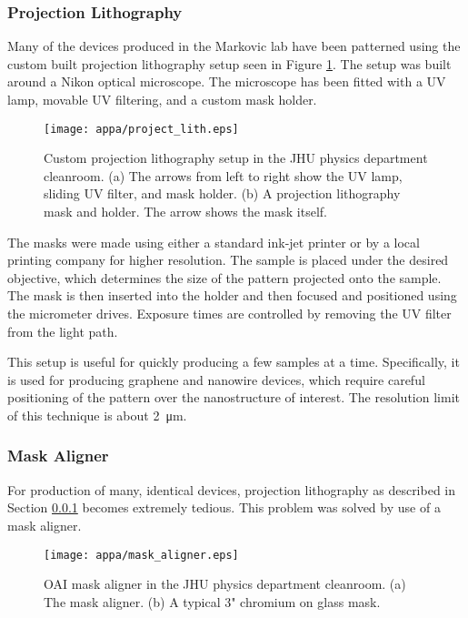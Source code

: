 \subsubsection{Projection Lithography}
\label{subsubsec:project_lith}

Many of the devices produced in the Markovic lab have been patterned using the custom built projection lithography setup seen in Figure \ref{fig:project_lith}. The setup was built around a Nikon optical microscope. The microscope has been fitted with a UV lamp, movable UV filtering, and a custom mask holder.

\begin{figure}
    \centering
    \texttt{[image: appa/project\_lith.eps]}
    \caption{Custom projection lithography setup in the JHU physics department cleanroom. (a) The arrows from left to right show the UV lamp, sliding UV filter, and mask holder. (b) A projection lithography mask and holder. The arrow shows the mask itself.}
    \label{fig:project_lith}
\end{figure}

The masks were made using either a standard ink-jet printer or by a local printing company for higher resolution. The sample is placed under the desired objective, which determines the size of the pattern projected onto the sample. The mask is then inserted into the holder and then focused and positioned using the micrometer drives. Exposure times are  controlled by removing the UV filter from the light path. 

This setup is useful for quickly producing a few samples at a time. Specifically, it is used for producing graphene and nanowire devices, which require careful positioning of the pattern over the nanostructure of interest. The resolution limit of this technique is about \SI{2}{\micro\meter}. 

\subsubsection{Mask Aligner}
\label{subsubsec:mask_aligner}

For production of many, identical devices, projection lithography as described in Section \ref{subsubsec:project_lith} becomes extremely tedious. This problem was solved by use of a mask aligner. 

\begin{figure}
    \centering
    \texttt{[image: appa/mask\_aligner.eps]}
    \caption{OAI mask aligner in the JHU physics department cleanroom. (a) The mask aligner. (b) A typical 3" chromium on glass mask.}
    \label{fig:mask_aligner}
\end{figure}

